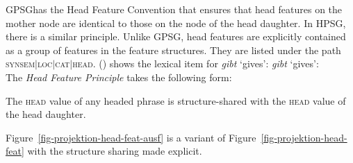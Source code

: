GPSG\indexgpsg has the Head Feature Convention that ensures that head features on the mother node are identical to those on the node of the head daughter.
In HPSG, there is a similar principle. Unlike GPSG, head features are explicitly contained as a group of features in the feature structures.
They are listed under the path \textsc{synsem$|$loc$|$cat$|$head}. () shows the lexical item
for \emph{gibt} `gives':
\eas
\emph{gibt} `gives':\\
\zs
The \emph{Head Feature Principle} takes the following form:
\begin{principle-break}
\label{prinzip-hfp}
The \textsc{head} value of any headed phrase is structure-shared with the \textsc{head} value of the head daughter.
\end{principle-break}
Figure~\vref{fig-projektion-head-feat-ausf} is a variant of Figure~\ref{fig-projektion-head-feat} with the structure sharing made
explicit.
